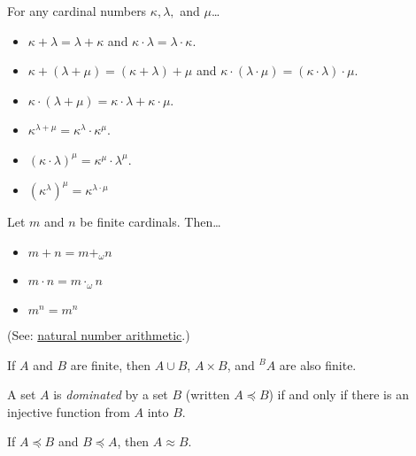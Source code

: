 \begin{proposition}
For any cardinal numbers $\kappa,\lambda,$ and $\mu$\dots
\begin{itemize}
  \item $\kappa + \lambda = \lambda + \kappa$ and $\kappa \cdot \lambda = \lambda \cdot \kappa$.
  \item $\kappa + (\lambda + \mu) = (\kappa + \lambda) + \mu$ and $\kappa \cdot (\lambda \cdot \mu) = (\kappa \cdot \lambda) \cdot \mu$.
  \item $\kappa \cdot (\lambda + \mu) = \kappa \cdot \lambda + \kappa \cdot \mu$.
  \item $\kappa^{\lambda + \mu} = \kappa^{\lambda} \cdot \kappa^{\mu}$.
  \item $(\kappa \cdot \lambda)^{\mu} = \kappa^{\mu} \cdot \lambda^{\mu}$.
  \item $(\kappa^{\lambda})^{\mu} = \kappa^{\lambda \cdot \mu}$
\end{itemize}
\end{proposition}

\begin{proposition}
Let $m$ and $n$ be finite cardinals. Then\dots
\begin{itemize}
	\item $m + n = m +_{\omega} n$
	\item $m \cdot n = m \cdot_{\omega} n$
	\item $m^n = m^n$
\end{itemize}
(See: \hyperref[arithmetic]{natural number arithmetic}.)
\end{proposition}

\begin{corollary}
If $A$ and $B$ are finite, then $A \cup B$, $A \times B$, and $^BA$ are also finite.
\end{corollary}

\label{cardinalordering}
A set $A$ is \emph{dominated}\label{dominated} by a set $B$ (written $A \preceq B$) if and only if there is an injective function from $A$ into $B$.

\begin{theorem}\label{schroderbernsteinthm}
If $A \preceq B$ and $B \preceq A$, then $A \approx B$.
\end{theorem}

